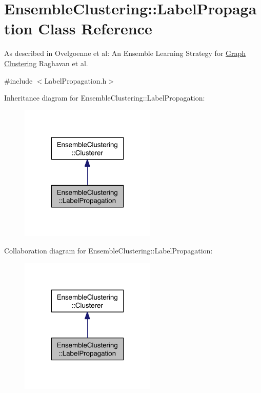 \hypertarget{class_ensemble_clustering_1_1_label_propagation}{\section{Ensemble\-Clustering\-:\-:Label\-Propagation Class Reference}
\label{class_ensemble_clustering_1_1_label_propagation}
}


As described in Ovelgoenne et al\-: An Ensemble Learning Strategy for \hyperlink{class_ensemble_clustering_1_1_graph}{Graph} \hyperlink{class_ensemble_clustering_1_1_clustering}{Clustering} Raghavan et al.  




{\ttfamily \#include $<$Label\-Propagation.\-h$>$}



Inheritance diagram for Ensemble\-Clustering\-:\-:Label\-Propagation\-:\nopagebreak
\begin{figure}[H]
\begin{center}
\leavevmode
\includegraphics[width=184pt]{class_ensemble_clustering_1_1_label_propagation__inherit__graph}
\end{center}
\end{figure}


Collaboration diagram for Ensemble\-Clustering\-:\-:Label\-Propagation\-:\nopagebreak
\begin{figure}[H]
\begin{center}
\leavevmode
\includegraphics[width=184pt]{class_ensemble_clustering_1_1_label_propagation__coll__graph}
\end{center}
\end{figure}
